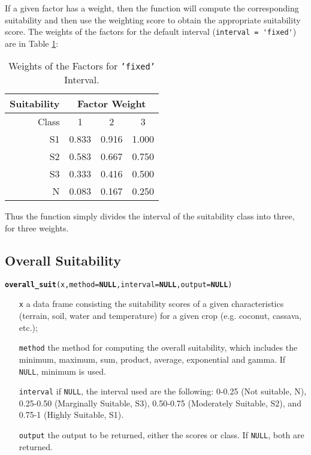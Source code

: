 \documentclass[11pt,fleqn]{article}\usepackage[]{graphicx}\usepackage[]{color}
\makeatletter
\newcommand{\hlstd}[1]{\textcolor[rgb]{0.345,0.345,0.345}{#1}}%
\newcommand{\hlkwa}[1]{\textcolor[rgb]{0.161,0.373,0.58}{\textbf{#1}}}%
\newcommand{\hlkwc}[1]{\textcolor[rgb]{0.333,0.667,0.333}{#1}}%
\newcommand{\hlkwd}[1]{\textcolor[rgb]{0.737,0.353,0.396}{\textbf{#1}}}%
\newenvironment{kframe}{%
 \def\at@end@of@kframe{}%
 \ifinner\ifhmode%
  \def\at@end@of@kframe{\end{minipage}}%
  \begin{minipage}{\columnwidth}%
 \fi\fi%
 \def\FrameCommand##1{\hskip\@totalleftmargin \hskip-\fboxsep
 \colorbox{shadecolor}{##1}\hskip-\fboxsep
     \hskip-\linewidth \hskip-\@totalleftmargin \hskip\columnwidth}%
 \MakeFramed {\advance\hsize-\width
   \@totalleftmargin\z@ \linewidth\hsize
   \@setminipage}}%
 {\par\unskip\endMakeFramed%
 \at@end@of@kframe}
\newenvironment{knitrout}{}{} %
\makeatother
\begin{document}
If a given factor has a weight, then the function will compute the corresponding suitability and then use the weighting score to obtain the appropriate suitability score. The weights of the factors for the default interval (\verb|interval = 'fixed'|) are in Table \ref{tab:fixweight}:
\begin{table}[!h]
\begin{tabular}{r|ccc}
\toprule
Suitability&\multicolumn{3}{|c}{Factor Weight}\\
\midrule
Class&1&2&3\\
\midrule
S1&0.833&0.916&1.000\\
S2&0.583&0.667&0.750\\
S3&0.333&0.416&0.500\\
N&0.083&0.167&0.250\\
\bottomrule
\end{tabular}
\caption{Weights of the Factors for \texttt{'fixed'} Interval.}
\label{tab:fixweight}
\end{table}

Thus the function simply divides the interval of the suitability class into three, for three weights.
\subsection{Overall Suitability}
\begin{knitrout}
\color{fgcolor}\begin{kframe}
\begin{alltt}
\hlkwd{overall_suit}\hlstd{(x,} \hlkwc{method} \hlstd{=} \hlkwa{NULL}\hlstd{,} \hlkwc{interval} \hlstd{=} \hlkwa{NULL}\hlstd{,} \hlkwc{output} \hlstd{=} \hlkwa{NULL}\hlstd{)}
\end{alltt}
\end{kframe}
\end{knitrout}
\vspace{-0.5cm}
\begin{itemize}[leftmargin=\dimexpr\linewidth-11.8cm-\rightmargin\relax]
\item[\texttt{x}] a data frame consisting the suitability scores of a given characteristics (terrain, soil, water and temperature) for a given crop (e.g. coconut, cassava, etc.);
\item[\texttt{method}] the method for computing the overall suitability, which includes the minimum, maximum, sum, product, average, exponential and gamma. If \verb|NULL|, minimum is used.
\item[\texttt{interval}] if \verb|NULL|, the interval used are the following: 0-0.25 (Not suitable, N), 0.25-0.50 (Marginally Suitable, S3), 0.50-0.75 (Moderately Suitable, S2), and 0.75-1 (Highly Suitable, S1).
\item[\texttt{output}] the output to be returned, either the scores or class. If \verb|NULL|, both are returned.
\end{itemize}
\end{document}
